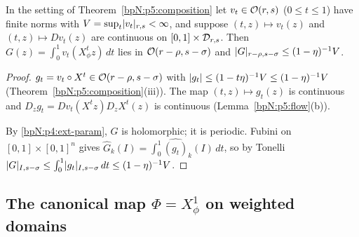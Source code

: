\begin{corollary}\label{bpN:p5:composition-integral}
In the setting of Theorem~\ref{bpN:p5:composition} let $v_t\in\mathcal O(r,s)$ ($0\le t\le1$) have finite norms with $V=\sup_t\lvert v_t\rvert_{r,s}<\infty$, and suppose $(t,z)\mapsto v_t(z)$ and $(t,z)\mapsto Dv_t(z)$ are continuous on $[0,1]\times\mathcal D_{r,s}$. Then $G(z)=\int_0^1v_t(X^t_\phi z)\,dt$ lies in $\mathcal O(r-\rho,s-\sigma)$ and $\lvert G\rvert_{r-\rho,s-\sigma}\le(1-\eta)^{-1}V$.
\end{corollary}
\begin{proof}
\label{stepN:p5:ci-integrand} $g_t=v_t\circ X^t\in\mathcal O(r-\rho,s-\sigma)$ with $\lvert g_t\rvert\le(1-t\eta)^{-1}V\le(1-\eta)^{-1}V$ (Theorem~\ref{bpN:p5:composition}(iii)). The map $(t,z)\mapsto g_t(z)$ is continuous and $D_zg_t=Dv_t(X^tz)D_zX^t(z)$ is continuous (Lemma~\ref{bpN:p5:flow}(b)).

\label{stepN:p5:ci-coeff} By \ref{bpN:p4:ext-param}, $G$ is holomorphic; it is periodic. Fubini on $[0,1]\times[0,1]^n$ gives $\hat G_k(I)=\int_0^1\hat{(g_t)}_k(I)\,dt$, so by Tonelli $\lvert G\rvert_{I,s-\sigma}\le\int_0^1\lvert g_t\rvert_{I,s-\sigma}\,dt\le(1-\eta)^{-1}V$.
\end{proof}

\subsection{The canonical map $\Phi=X^1_\phi$ on weighted domains}\label{bpN:p5:s-map}

